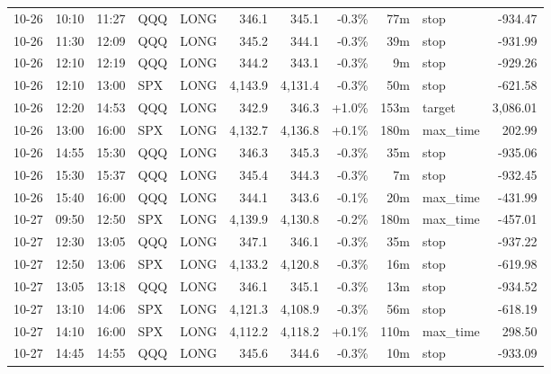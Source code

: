 \documentclass[11pt,a4paper,twoside]{article}
\begin{document}
\begin{center}
\begin{longtable}{>{\color{txtmain}}l l l l l r r r r >{\color{txtmain}}l r}
10-26 & 10:10 & 11:27 & QQQ & LONG & 346.1 & 345.1 & \textcolor{lossred}{-0.3\%} & 77m & stop & \textcolor{lossred}{-934.47} \\
10-26 & 11:30 & 12:09 & QQQ & LONG & 345.2 & 344.1 & \textcolor{lossred}{-0.3\%} & 39m & stop & \textcolor{lossred}{-931.99} \\
10-26 & 12:10 & 12:19 & QQQ & LONG & 344.2 & 343.1 & \textcolor{lossred}{-0.3\%} & 9m & stop & \textcolor{lossred}{-929.26} \\
10-26 & 12:10 & 13:00 & SPX & LONG & 4,143.9 & 4,131.4 & \textcolor{lossred}{-0.3\%} & 50m & stop & \textcolor{lossred}{-621.58} \\
10-26 & 12:20 & 14:53 & QQQ & LONG & 342.9 & 346.3 & \textcolor{wingreen}{+1.0\%} & 153m & target & \textcolor{wingreen}{3,086.01} \\
10-26 & 13:00 & 16:00 & SPX & LONG & 4,132.7 & 4,136.8 & \textcolor{wingreen}{+0.1\%} & 180m & max\_time & \textcolor{wingreen}{202.99} \\
10-26 & 14:55 & 15:30 & QQQ & LONG & 346.3 & 345.3 & \textcolor{lossred}{-0.3\%} & 35m & stop & \textcolor{lossred}{-935.06} \\
10-26 & 15:30 & 15:37 & QQQ & LONG & 345.4 & 344.3 & \textcolor{lossred}{-0.3\%} & 7m & stop & \textcolor{lossred}{-932.45} \\
10-26 & 15:40 & 16:00 & QQQ & LONG & 344.1 & 343.6 & \textcolor{lossred}{-0.1\%} & 20m & max\_time & \textcolor{lossred}{-431.99} \\
10-27 & 09:50 & 12:50 & SPX & LONG & 4,139.9 & 4,130.8 & \textcolor{lossred}{-0.2\%} & 180m & max\_time & \textcolor{lossred}{-457.01} \\
10-27 & 12:30 & 13:05 & QQQ & LONG & 347.1 & 346.1 & \textcolor{lossred}{-0.3\%} & 35m & stop & \textcolor{lossred}{-937.22} \\
10-27 & 12:50 & 13:06 & SPX & LONG & 4,133.2 & 4,120.8 & \textcolor{lossred}{-0.3\%} & 16m & stop & \textcolor{lossred}{-619.98} \\
10-27 & 13:05 & 13:18 & QQQ & LONG & 346.1 & 345.1 & \textcolor{lossred}{-0.3\%} & 13m & stop & \textcolor{lossred}{-934.52} \\
10-27 & 13:10 & 14:06 & SPX & LONG & 4,121.3 & 4,108.9 & \textcolor{lossred}{-0.3\%} & 56m & stop & \textcolor{lossred}{-618.19} \\
10-27 & 14:10 & 16:00 & SPX & LONG & 4,112.2 & 4,118.2 & \textcolor{wingreen}{+0.1\%} & 110m & max\_time & \textcolor{wingreen}{298.50} \\
10-27 & 14:45 & 14:55 & QQQ & LONG & 345.6 & 344.6 & \textcolor{lossred}{-0.3\%} & 10m & stop & \textcolor{lossred}{-933.09} \\

\end{longtable}
\end{center}
\end{document}
